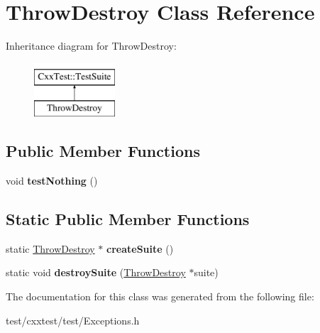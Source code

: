 \hypertarget{classThrowDestroy}{\section{Throw\-Destroy Class Reference}
\label{classThrowDestroy}
}
Inheritance diagram for Throw\-Destroy\-:\begin{figure}[H]
\begin{center}
\leavevmode
\includegraphics[height=2.000000cm]{classThrowDestroy}
\end{center}
\end{figure}
\subsection*{Public Member Functions}
\begin{DoxyCompactItemize}
\item 
\hypertarget{classThrowDestroy_a9fd484daf67117d33c139b5c8434a935}{void {\bfseries test\-Nothing} ()}\label{classThrowDestroy_a9fd484daf67117d33c139b5c8434a935}

\end{DoxyCompactItemize}
\subsection*{Static Public Member Functions}
\begin{DoxyCompactItemize}
\item 
\hypertarget{classThrowDestroy_ab1744503e9555fab6b04fa0c04d1008c}{static \hyperlink{classThrowDestroy}{Throw\-Destroy} $\ast$ {\bfseries create\-Suite} ()}\label{classThrowDestroy_ab1744503e9555fab6b04fa0c04d1008c}

\item 
\hypertarget{classThrowDestroy_afa9a65dda28b4c7f32eb372687fb44f0}{static void {\bfseries destroy\-Suite} (\hyperlink{classThrowDestroy}{Throw\-Destroy} $\ast$suite)}\label{classThrowDestroy_afa9a65dda28b4c7f32eb372687fb44f0}

\end{DoxyCompactItemize}


The documentation for this class was generated from the following file\-:\begin{DoxyCompactItemize}
\item 
test/cxxtest/test/Exceptions.\-h\end{DoxyCompactItemize}
